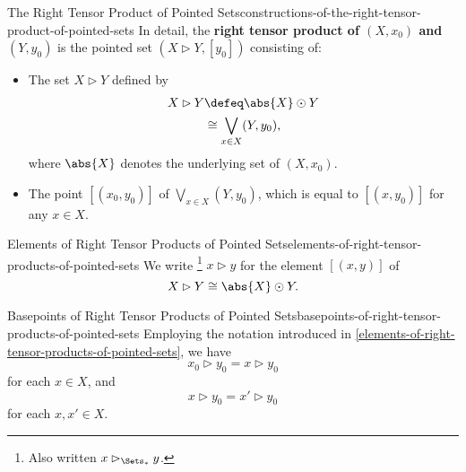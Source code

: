 \begin{construction}{The Right Tensor Product of Pointed Sets}{constructions-of-the-right-tensor-product-of-pointed-sets}%
    In detail, the \textbf{right tensor product of $(X,x_{0})$ and $(Y,y_{0})$} is the pointed set $(X\rhd Y,[y_{0}])$ consisting of:
    \begin{itemize}
        \item{}The set $X\rhd Y$ defined by
            \begin{align*}
                X\rhd Y &\defeq \abs{X}\odot Y\\
                        &\cong  \bigvee_{x\in X}(Y,y_{0}),
            \end{align*}
            where $\abs{X}$ denotes the underlying set of $(X,x_{0})$.
        \item{}The point $[(x_{0},y_{0})]$ of $\bigvee_{x\in X}(Y,y_{0})$, which is equal to $[(x,y_{0})]$ for any $x\in X$.
    \end{itemize}
\end{construction}
\begin{notation}{Elements of Right Tensor Products of Pointed Sets}{elements-of-right-tensor-products-of-pointed-sets}%
    We write%
    \footnote{%
        Also written $x\rhd_{\Sets_{*}}y$.
        \par\vspace*{\TCBBoxCorrection}
    } %
    $x\rhd y$ for the element $[(x,y)]$ of
    \[
        X\rhd Y%
        \cong%
        \abs{X}\odot Y.%
    \]%
\end{notation}
\begin{remark}{Basepoints of Right Tensor Products of Pointed Sets}{basepoints-of-right-tensor-products-of-pointed-sets}%
    Employing the notation introduced in \cref{elements-of-right-tensor-products-of-pointed-sets}, we have
    \[
        x_{0}\rhd y_{0}%
        =%
        x\rhd y_{0}%
    \]%
    for each $x\in X$, and
    \[
        x\rhd y_{0}%
        =%
        x'\rhd y_{0}%
    \]%
    for each $x,x'\in X$.
\end{remark}
